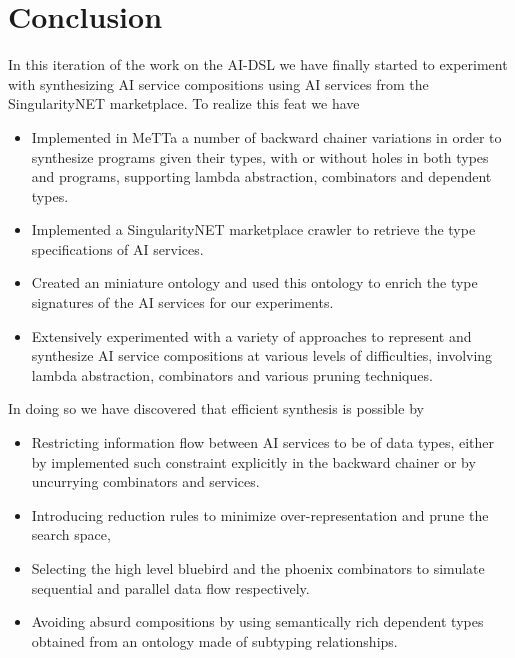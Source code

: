 \documentclass[]{report}
\begin{document}
\chapter{Conclusion}
In this iteration of the work on the AI-DSL we have finally started to
experiment with synthesizing AI service compositions using AI services
from the SingularityNET marketplace.  To realize this feat we have
\begin{itemize}
\item Implemented in MeTTa a number of backward chainer variations in
  order to synthesize programs given their types, with or without
  holes in both types and programs, supporting lambda abstraction,
  combinators and dependent types.
\item Implemented a SingularityNET marketplace crawler to retrieve the
  type specifications of AI services.
\item Created an miniature ontology and used this ontology to enrich
  the type signatures of the AI services for our experiments.
\item Extensively experimented with a variety of approaches to
  represent and synthesize AI service compositions at various levels
  of difficulties, involving lambda abstraction, combinators and
  various pruning techniques.
\end{itemize}
In doing so we have discovered that efficient synthesis is possible by
\begin{itemize}
\item Restricting information flow between AI services to be of data
  types, either by implemented such constraint explicitly in the
  backward chainer or by uncurrying combinators and services.
\item Introducing reduction rules to minimize over-representation and
  prune the search space,
\item Selecting the high level bluebird and the phoenix combinators to
  simulate sequential and parallel data flow respectively.
\item Avoiding absurd compositions by using semantically rich
  dependent types obtained from an ontology made of subtyping
  relationships.
\end{itemize}
\end{document}
